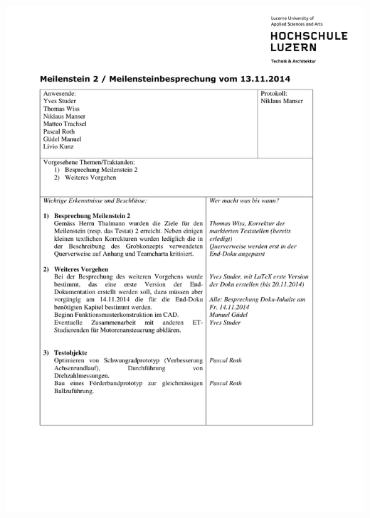   	 \includegraphics[page=1,width=\textwidth]{Anhangsdokument/Besprechung_MS2.pdf}


    
    \newpage
    \listoffigures      
    
    \begin{flushleft}
        \renewcommand{\refname}{Literatur- und Quellenverzeichnis}
    \end{flushleft}
    \appendix
    
      
